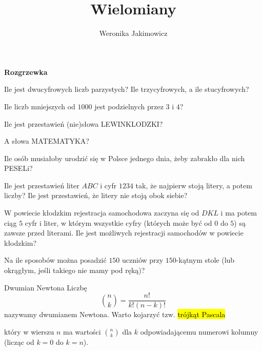 \documentclass{../uoom}
\title{Wielomiany}
\author{Weronika Jakimowicz}
\date{}
\begin{document}
\noindent\makebox[\linewidth]{\rule{\textwidth}{0.4pt}}

\textbf{\large Rozgrzewka}

\begin{zadanie}
  Ile jest dwucyfrowych liczb parzystych? Ile trzycyfrowych, a ile stucyfrowych?
\end{zadanie}

\begin{zadanie}
  Ile liczb  mniejszych od $1000$ jest podzielnych przez $3$ i $4$?
\end{zadanie}

\begin{zadanie}
  Ile jest przestawień (nie)słowa LEWINKLODZKI?
\end{zadanie}

\noindent\makebox[\linewidth]{\rule{\textwidth}{0.4pt}}

\begin{zadanie}
  A słowa MATEMATYKA?
\end{zadanie}

\begin{zadanie}
  Ile osób musiałoby urodzić się w Polsce jednego dnia, żeby zabrakło dla nich PESELi?
\end{zadanie}

\begin{zadanie}
  Ile jest przestawień liter $ABC$ i cyfr $1234$ tak, że najpierw stoją litery, a potem liczby? Ile jest przestawień, że litery nie stoją obok siebie?
\end{zadanie}

\begin{zadanie}
  W powiecie kłodzkim rejestracja samochodowa zaczyna się od $DKL$ i ma potem ciąg $5$ cyfr i liter, w którym wszystkie cyfry (których może być od $0$ do $5$) są zawsze przed literami. Ile jest możliwych rejestracji samochodów w powiecie kłodzkim?
\end{zadanie}

\begin{zadanie}
  Na ile sposobów można posadzić $150$ uczniów przy $150$-kątnym stole (lub okrągłym, jeśli takiego nie mamy pod ręką)?
\end{zadanie}

\begin{mybox}{Dwumian Newtona}
  Liczbę
  $$\binom{n}{k}=\frac{n!}{k!(n-k)!}$$
  nazywamy dwumianem Newtona. Warto kojarzyć tzw. \hl{trójkąt Pascala}
  \begin{center}
  \end{center}
  \medskip
  który w wierszu $n$ ma wartości $\binom{n}{k}$ dla $k$ odpowiadającemu numerowi kolumny (licząc od $k=0$ do $k=n$).
\end{mybox}
\end{document}

